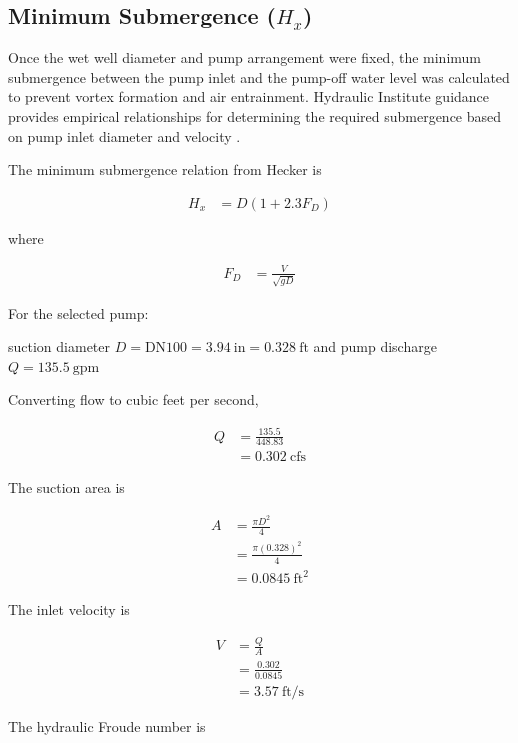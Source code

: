 \subsection{Minimum Submergence ($H_x$)}

Once the wet well diameter and pump arrangement were fixed, the minimum submergence between the pump inlet and the pump-off water level was calculated to prevent vortex formation and air entrainment. Hydraulic Institute guidance provides empirical relationships for determining the required submergence based on pump inlet diameter and velocity \cite{ANSI_HI_98_1998,Hecker_1987_Conclusions}.

The minimum submergence relation from Hecker is

\[
\begin{aligned}
H_x &= D(1+2.3F_D)
\end{aligned}
\]

where

\[
\begin{aligned}
F_D &= \frac{V}{\sqrt{gD}}
\end{aligned}
\]

For the selected pump:

suction diameter $D=\text{DN100}=3.94~\text{in}=0.328~\text{ft}$
and pump discharge $Q=135.5~\text{gpm}$

Converting flow to cubic feet per second,

\[
\begin{aligned}
Q &= \frac{135.5}{448.83} \\
&= 0.302~\text{cfs}
\end{aligned}
\]

The suction area is

\[
\begin{aligned}
A &= \frac{\pi D^2}{4} \\
&= \frac{\pi(0.328)^2}{4} \\
&= 0.0845~\text{ft}^2
\end{aligned}
\]

The inlet velocity is

\[
\begin{aligned}
V &= \frac{Q}{A} \\
&= \frac{0.302}{0.0845} \\
&= 3.57~\text{ft/s}
\end{aligned}
\]

The hydraulic Froude number is

